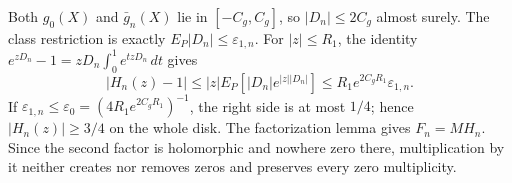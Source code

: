 Both \(g_0(X)\) and \(\bar g_n(X)\) lie in \([-C_g,C_g]\), so \(|D_n|\le2C_g\) almost surely.  The class restriction is exactly \(E_P|D_n|\le\varepsilon_{1,n}\).  For \(|z|\le R_1\), the identity
\(e^{zD_n}-1=zD_n\int_0^1e^{tzD_n}\,dt\) gives
\[
 |H_n(z)-1|
 \le |z|E_P[|D_n|e^{|z||D_n|}]
 \le R_1e^{2C_gR_1}\varepsilon_{1,n}.
\]
If \(\varepsilon_{1,n}\le\varepsilon_0=(4R_1e^{2C_gR_1})^{-1}\), the right side is at most \(1/4\); hence \(|H_n(z)|\ge3/4\) on the whole disk.  The factorization lemma gives \(F_n=MH_n\).  Since the second factor is holomorphic and nowhere zero there, multiplication by it neither creates nor removes zeros and preserves every zero multiplicity.